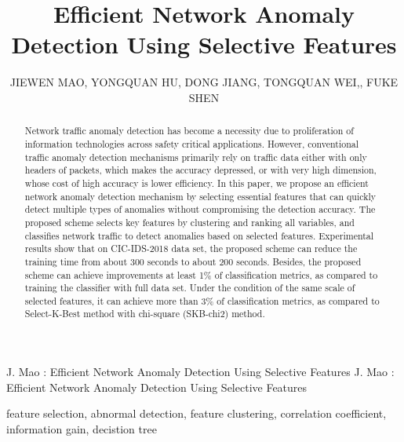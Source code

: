 \documentclass{ieeeaccess}
\theoremstyle{definition}
\begin{document}

\title{Efficient Network Anomaly Detection Using Selective Features}
\author{
    \uppercase{Jiewen Mao},
    \uppercase{Yongquan Hu},
    \uppercase{Dong Jiang},
    \uppercase{Tongquan Wei},, \uppercase{Fuke Shen}}
\address{School of Computer Science and Technology, East China Normal University, Shanghai 200062, China}

\markboth
{J. Mao \headeretal: Efficient Network Anomaly Detection Using Selective Features}
{J. Mao \headeretal: Efficient Network Anomaly Detection Using Selective Features}


\begin{abstract}
    Network traffic anomaly detection has become a necessity due to proliferation of information technologies across safety critical applications. 
    However, conventional traffic anomaly detection mechanisms primarily rely on traffic data either with only headers of packets, which makes the accuracy depressed, or with very high dimension, whose cost of high accuracy is lower efficiency. 
    In this paper, we propose an efficient network anomaly detection mechanism by selecting essential features that can quickly detect multiple types of anomalies without compromising the detection accuracy.
    The proposed scheme selects key features by clustering and ranking all variables, and classifies network traffic to detect anomalies based on selected features.
    Experimental results show that on CIC-IDS-2018 data set, the proposed scheme can reduce the training time from about 300 seconds to about 200 seconds. Besides, the proposed scheme can achieve improvements at least 1\% of classification metrics, as compared to training the classifier with full data set. 
    Under the condition of the same scale of selected features, it can achieve more than 3\% of classification metrics, as compared to Select-K-Best method with chi-square (SKB-chi2) method.
\end{abstract}

\begin{keywords}
    feature selection, abnormal detection, feature clustering, correlation coefficient, information gain, decistion tree
\end{keywords}

\titlepgskip=-15pt
\end{document}
